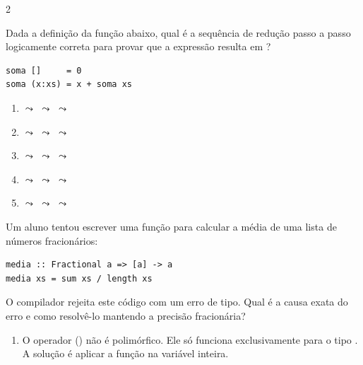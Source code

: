 \documentclass[a4paper,10pt,brazil]{article}
\begin{document}
\begin{multicols}{2}
\begin{enumerate}
\end{enumerate}

Dada a definição da função  abaixo, qual é a sequência de redução passo a passo logicamente correta para provar que a expressão  resulta em ?

\begin{verbatim}
soma []     = 0
soma (x:xs) = x + soma xs
\end{verbatim}

\begin{enumerate}
  \item {} $\leadsto$  $\leadsto$  $\leadsto$ 

  \item {} $\leadsto$  $\leadsto$  $\leadsto$ 

  \item {} $\leadsto$  $\leadsto$  $\leadsto$ 

  \item {} $\leadsto$  $\leadsto$  $\leadsto$ 

  \item {} $\leadsto$  $\leadsto$  $\leadsto$ 


\end{enumerate}

Um aluno tentou escrever uma função para calcular a média de uma lista de números fracionários:
\begin{verbatim}
media :: Fractional a => [a] -> a
media xs = sum xs / length xs
\end{verbatim}
O compilador rejeita este código com um erro de tipo. Qual é a causa exata do erro e como resolvê-lo mantendo a precisão fracionária?

\begin{enumerate}
  \item O operador (\haskellinline{/}) não é polimórfico. Ele só funciona exclusivamente para o tipo . A solução é aplicar a função  na variável  inteira.


\end{enumerate}
\end{multicols}
\end{document}
